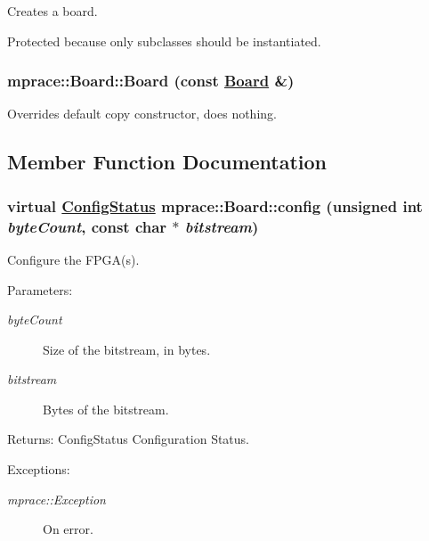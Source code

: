 Creates a board. 

Protected because only subclasses should be instantiated.\hypertarget{classmprace_1_1Board_b1}{
\subsubsection[Board]{\setlength{\rightskip}{0pt plus 5cm}mprace::Board::Board (const \hyperlink{classmprace_1_1Board}{Board} \&)}}
\label{classmprace_1_1Board_b1}


Overrides default copy constructor, does nothing. 



\subsection{Member Function Documentation}
\hypertarget{classmprace_1_1Board_a15}{
\subsubsection[config]{\setlength{\rightskip}{0pt plus 5cm}virtual \hyperlink{classmprace_1_1Board_w4}{Config\-Status} mprace::Board::config (unsigned int {\em byte\-Count}, const char $\ast$ {\em bitstream})}}
\label{classmprace_1_1Board_a15}


Configure the FPGA(s). 

\begin{Desc}
\item[Parameters:]
\begin{description}
\item[{\em byte\-Count}]Size of the bitstream, in bytes. \item[{\em bitstream}]Bytes of the bitstream. \end{description}
\end{Desc}
\begin{Desc}
\item[Returns:]Config\-Status Configuration Status. \end{Desc}
\begin{Desc}
\item[Exceptions:]
\begin{description}
\item[{\em mprace::Exception}]On error.\end{description}
\end{Desc}


